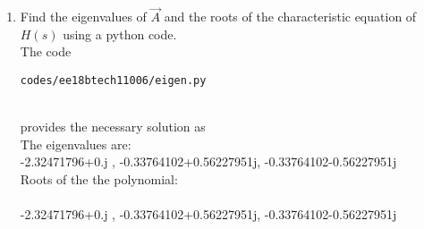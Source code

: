 \begin{enumerate}[label=\thesection.\arabic*.,ref=\thesection.\theenumi]
\item Find the eigenvalues of $\vec{A}$ and the roots of the characteristic equation of $H(s)$ using a python code.
\\
\solution
The code 
\begin{lstlisting}
codes/ee18btech11006/eigen.py
\end{lstlisting}\\
provides the necessary solution as\\
The eigenvalues are:
\\-2.32471796+0.j , -0.33764102+0.56227951j, -0.33764102-0.56227951j\\
Roots of the the polynomial:\\
\\-2.32471796+0.j , -0.33764102+0.56227951j, -0.33764102-0.56227951j\\
\end{enumerate}

